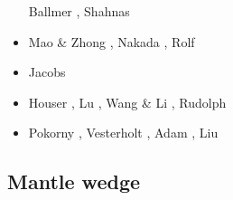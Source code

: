 \begin{scriptsize}
\begin{itemize}
                             Ballmer \etal \cite{bahh17}, Shahnas \etal \cite{shyp17,shpj17}
\item[\twothousandeighteen] Mao \& Zhong \cite{mazh18}, Nakada \etal \cite{naoi18}, Rolf \etal \cite{roct18}
\item[\twothousandnineteen] Jacobs \etal \cite{jasv19}
\item[\twothousandtwenty] Houser \etal \cite{hohv20}, Lu \etal{} \cite{lufs20}, Wang \& Li \cite{wali20},
                          Rudolph \etal \cite{ruml20}
\item[\twothousandtwentyone] Pokorny \etal \cite{pocv21}, Vesterholt \etal \cite{vepn21},
                             Adam \etal \cite{adkc21}, Liu \etal \cite{ligl21b}
\end{itemize}
\end{scriptsize}


\subsection{Mantle wedge} 

